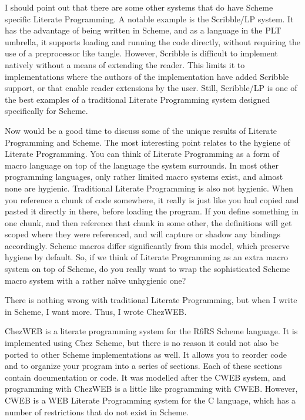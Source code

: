 I should point out that there are some other systems that do have
Scheme specific Literate Programming.  A notable example is the
Scribble/LP system.  It has the advantage of being written in Scheme,
and as a language in the PLT umbrella, it supports loading and running
the code directly, without requiring the use of a preprocessor like
tangle.  However, Scribble is difficult to implement natively without
a means of extending the reader.  This limits it to implementations
where the authors of the implementation have added Scribble support,
or that enable reader extensions by the user.  Still, Scribble/LP is
one of the best examples of a traditional Literate Programming system
designed specifically for Scheme.

Now would be a good time to discuss some of the unique results of
Literate Programming and Scheme.  The most interesting point relates
to the hygiene of Literate Programming.  You can think of Literate
Programming as a form of macro language on top of the language the
system surrounds.  In most other programming languages, only rather
limited macro systems exist, and almost none are hygienic.
Traditional Literate Programming is also not hygienic.  When you
reference a chunk of code somewhere, it really is just like you had
copied and pasted it directly in there, before loading the program.
If you define something in one chunk, and then reference that chunk in
some other, the definitions will get scoped where they were
referenced, and will capture or shadow any bindings accordingly.
Scheme macros differ significantly from this model, which preserve
hygiene by default.  So, if we think of Literate Programming as an
extra macro system on top of Scheme, do you really want to wrap the
sophisticated Scheme macro system with a rather na\"\i ve unhygienic
one?

There is nothing wrong with traditional Literate Programming, but when
I write in Scheme, I want more.  Thus, I wrote ChezWEB.

%
ChezWEB is a literate programming system for the R6RS Scheme language.
It is implemented using Chez Scheme, but there is no reason it could
not also be ported to other Scheme implementations as well.  It allows
you to reorder code and to organize your program into a series of
sections.  Each of these sections contain documentation or code.  It
was modelled after the CWEB system, and programming with ChezWEB is a
little like programming with CWEB.  However, CWEB is a WEB Literate
Programming system for the C language, which has a number of
restrictions that do not exist in Scheme.

